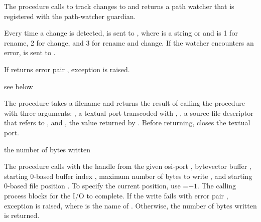 The  procedure calls  to track
changes to  and returns a path watcher that is registered
with the path-watcher guardian.

Every time a change is detected,  is sent to , where
 is a string or  and
 is 1 for rename, 2 for change, and 3 for rename and
change. If the watcher encounters an error,
 is sent to
.

If  returns error pair , exception  is raised.

\begin{procedure}
\end{procedure}
\returns{} see below

The  procedure takes a filename
 and returns the result of calling the procedure
 with three arguments: , a textual port
transcoded with , , a
source-file descriptor that refers to , and
, the value returned by .
Before returning,  closes the textual
port.

\begin{procedure}
\end{procedure}
\returns{} the number of bytes written

The  procedure calls  with
the handle from the given osi-port , bytevector buffer
, starting 0-based buffer index , maximum number of
bytes to write , and starting 0-based file position
. To specify the current position, use =$-1$. The
calling process blocks for the I/O to complete. If the write fails
with error pair , exception
 is raised, where
 is the name of . Otherwise, the number of bytes
written is returned.

